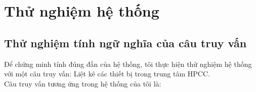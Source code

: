 \chapter{Thử nghiệm hệ thống}
\renewcommand{\baselinestretch}{1.2}
\section{Thử nghiệm tính ngữ nghĩa của câu truy vấn}
Để chứng minh tính đúng đắn của hệ thống, tôi thực hiện thử nghiệm hệ thống với một câu truy vấn: Liệt kê các thiết bị trong trung tâm HPCC. \\
Câu truy vấn tương ứng trong hệ thống của tôi là:


